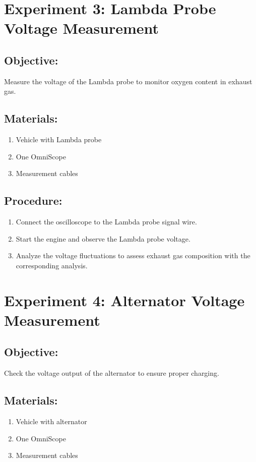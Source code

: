 \documentclass{scrreprt}
\begin{document}
\section*{Experiment 3: Lambda Probe Voltage Measurement}
\subsection*{Objective:} Measure the voltage of the Lambda probe to monitor oxygen content in exhaust gas.
\subsection*{Materials:}
\begin{enumerate}
    \item Vehicle with Lambda probe
    \item One OmniScope
    \item Measurement cables
\end{enumerate}
\subsection*{Procedure:}
\begin{enumerate}
    \item Connect the oscilloscope to the Lambda probe signal wire.
    \item Start the engine and observe the Lambda probe voltage.
    \item Analyze the voltage fluctuations to assess exhaust gas composition with the corresponding analysis.
\end{enumerate}

\section*{Experiment 4: Alternator Voltage Measurement}
\subsection*{Objective:} Check the voltage output of the alternator to ensure proper charging.
\subsection*{Materials:}
\begin{enumerate}
    \item Vehicle with alternator
    \item One OmniScope
    \item Measurement cables
\end{enumerate}
\end{document}
